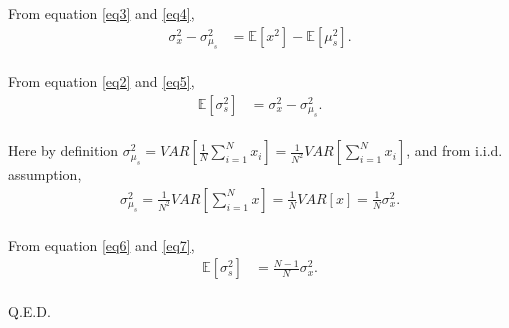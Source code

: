 \documentclass[a4]{article}
\begin{document}
From equation \ref{eq3} and \ref{eq4},
\begin{equation}
\begin{aligned}
\sigma_x^2 - \sigma_{\mu_s}^2 &= \mathbb{E}[x^2] - \mathbb{E}[\mu_s^2]\label{eq5}.\\
\end{aligned}
\end{equation}

From equation \ref{eq2} and \ref{eq5},
\begin{equation}
\begin{aligned}
\mathbb{E}[\sigma_s^2] &= \sigma_x^2 - \sigma_{\mu_s}^2\label{eq6}.\\
\end{aligned}
\end{equation}

Here by definition $\sigma_{\mu_s}^2 = V\!\!A\!R[\frac{1}{N}\sum_{i=1}^{N}x_i] = \frac{1}{N^2}V\!\!A\!R[\sum_{i=1}^{N}x_i]$,
and from i.i.d. assumption,
\begin{equation}
\begin{aligned}
\sigma_{\mu_s}^2 = \frac{1}{N^2}V\!\!A\!R[\sum_{i=1}^{N}x] = \frac{1}{N}V\!\!A\!R[x] = \frac{1}{N}\sigma_x^2\label{eq7}.\\
\end{aligned}
\end{equation}

From equation \ref{eq6} and \ref{eq7},
\begin{equation}
\begin{aligned}
\mathbb{E}[\sigma_s^2] &= \frac{N-1}{N}\sigma_x^2\label{eq8}.\\
\end{aligned}
\end{equation}

Q.E.D.

{}

\end{document}
